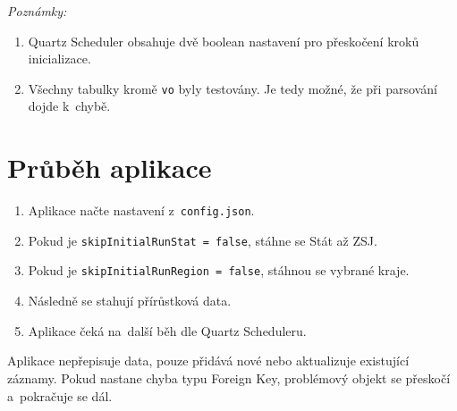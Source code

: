 \textit{Poznámky:}
\begin{enumerate}
  \item Quartz Scheduler obsahuje dvě boolean nastavení pro přeskočení kroků inicializace.
  \item Všechny tabulky kromě \texttt{vo} byly testovány. Je tedy možné, že při parsování dojde k~chybě.
\end{enumerate}

\section*{Průběh aplikace}
\begin{enumerate}
  \item Aplikace načte nastavení z~\texttt{config.json}.
  \item Pokud je \texttt{skipInitialRunStat = false}, stáhne se Stát až ZSJ.
  \item Pokud je \texttt{skipInitialRunRegion = false}, stáhnou se vybrané kraje.
  \item Následně se stahují přírůstková data.
  \item Aplikace čeká na~další běh dle Quartz Scheduleru.
\end{enumerate}

Aplikace nepřepisuje data, pouze přidává nové nebo aktualizuje existující záznamy.
Pokud nastane chyba typu Foreign Key, problémový objekt se přeskočí a~pokračuje se dál.